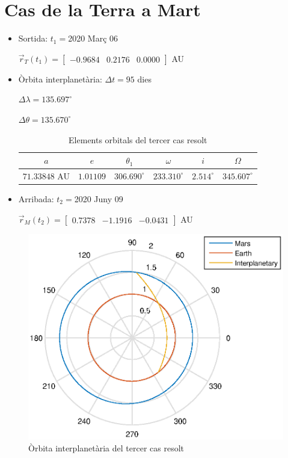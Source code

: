 \section{Cas de la Terra a Mart}
\begin{itemize}
	\item Sortida: $t_{1}=$2020 Març 06

$\vec{r}_{T}(t_{1})=\begin{bmatrix}-0.9684 & 0.2176 & 0.0000\end{bmatrix}$ AU

	\item Òrbita interplanetària: $\Delta t=95$ dies

$\Delta\lambda=135.697^{\circ}$

$\Delta\theta=135.670^{\circ}$
\begin{table}[h!]
	\centering
	\begin{tabular}{ |c|c|c|c|c|c|}
		\hline
		$a$ & $e$ & $\theta_{1}$ & $\omega$ & $i$ & $\Omega$ \\ \hline
		$71.33848$ AU  & $1.01109$ & $306.690^{\circ}$ & $233.310^{\circ}$ & $2.514^{\circ}$ & $345.607^{\circ}$ \\ \hline
	\end{tabular}
	\caption{Elements orbitals del tercer cas resolt}
\end{table}

	\item Arribada: $t_{2}=$2020 Juny 09

$\vec{r}_{M}(t_{2})=\begin{bmatrix}0.7378 & -1.1916 & -0.0431\end{bmatrix}$ AU
\end{itemize}
\begin{figure}[H]
	\centering
	\includegraphics[scale=0.95]{./plots/ex3}
	\caption{Òrbita interplanetària del tercer cas resolt}
\end{figure}

